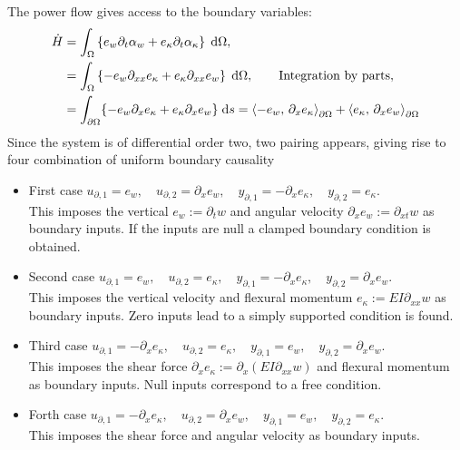 \documentclass{article}
\newcommand{\inner}[3][]{\ensuremath{\left\langle #2, \, #3 \right\rangle_{#1}}}
\begin{document}
The power flow gives access to the boundary variables:
\begin{equation}\label{eq:powrateEB}
\begin{aligned}
\dot{H} &= \int_{\Omega} \left\{e_w \partial_t \alpha_w + e_\kappa \partial_t \alpha_\kappa \right\}  \d{\Omega}, \\
&= \int_{\Omega} \left\{-e_w \partial_{xx}e_\kappa + e_\kappa \partial_{xx} e_w \right\} \d{\Omega}, \qquad \text{Integration by parts}, \\
&= \int_{\partial\Omega}\{-e_w \partial_{x}e_\kappa + e_\kappa \partial_{x} e_w \} \d{s}= \inner[\partial\Omega]{-e_w}{\partial_{x}e_\kappa} + \inner[\partial\Omega]{e_\kappa}{\partial_{x}e_w}
\end{aligned}
\end{equation}
Since the system is of differential order two, two pairing appears, giving rise to four combination of uniform boundary causality
\begin{itemize}
	\item {First case} ${u}_{\partial, 1} = e_w, \quad {u}_{\partial, 2} = \partial_x e_w, \quad {y}_{\partial, 1} = -\partial_{x}e_\kappa, \quad {y}_{\partial, 2} = e_\kappa$. \\
	This imposes the vertical $e_w:= \partial_t w$ and angular velocity $\partial_x e_w:= \partial_{xt} w$ as boundary inputs. If the inputs are null a clamped boundary condition is obtained.
	\item {Second case} ${u}_{\partial, 1} = e_w, \quad {u}_{\partial, 2} = e_\kappa, \quad {y}_{\partial, 1} = -\partial_{x}e_\kappa, \quad {y}_{\partial, 2} = \partial_x e_w$. \\
	This imposes the vertical velocity and flexural momentum $e_\kappa:= EI \partial_{xx} w$ as boundary inputs.  Zero inputs lead to a simply supported condition is found.
	\item {Third case} ${u}_{\partial, 1} = -\partial_{x}e_\kappa , \quad {u}_{\partial, 2} = e_\kappa, \quad {y}_{\partial, 1} = e_w, \quad {y}_{\partial, 2} = \partial_x e_w$. \\
	This imposes the shear force $\partial_{x}e_\kappa:= \partial_{x}(EI \partial_{xx}w)$ and flexural momentum as boundary inputs. Null inputs correspond to a free condition.
	\item {Forth case} ${u}_{\partial, 1} = -\partial_{x}e_\kappa , \quad {u}_{\partial, 2} = \partial_{x}e_w, \quad {y}_{\partial, 1} = e_w, \quad {y}_{\partial, 2} = e_\kappa$. \\
	This imposes the shear force and angular velocity as boundary inputs.
\end{itemize} 
\end{document}
